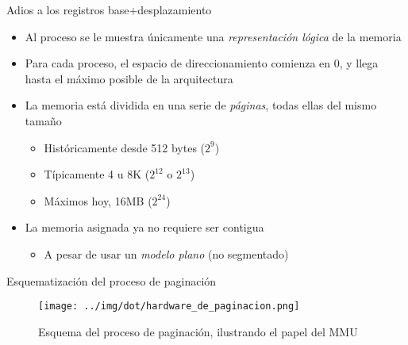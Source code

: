 \documentclass[presentation]{beamer}
\newcommand{\rarrow}{$\rightarrow$\hskip 0.5em}
\begin{document}
\begin{frame}[label={sec:org9bb0bdf}]{Adios a los registros base+desplazamiento}
\begin{itemize}
\item Al proceso se le muestra únicamente una \emph{representación lógica} de
la memoria
\item Para cada proceso, el espacio de direccionamiento comienza en 0, y
llega hasta el máximo posible de la arquitectura
\item La memoria está dividida en una serie de \emph{páginas}, todas ellas del
mismo tamaño
\begin{itemize}
\item Históricamente desde 512 bytes (\(2^9\))
\item Típicamente 4 u 8K (\(2^{12}\) o \(2^{13}\))
\item Máximos hoy, 16MB (\(2^{24}\))
\end{itemize}
\item La memoria asignada ya no requiere ser contigua
\begin{itemize}
\item A pesar de usar un \emph{modelo plano} (no segmentado)
\end{itemize}
\end{itemize}
\end{frame}

\begin{frame}[label={sec:orga94e079}]{Esquematización del proceso de paginación}
\begin{figure}[htbp]
\centering
\texttt{[image: ../img/dot/hardware\_de\_paginacion.png]}
\caption{Esquema del proceso de paginación, ilustrando el papel del MMU}
\end{figure}
\end{frame}

\end{document}
